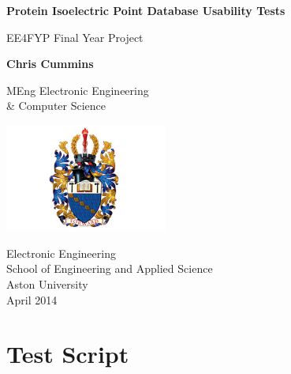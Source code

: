 \documentclass[12pt,twoside]{report}
\begin{document}

%
%
%
\begin{titlepage}
  \begin{center}
    \vspace*{1cm}

    \Huge
    \textbf{Protein Isoelectric Point Database Usability Tests}

    \vspace{0.5cm}
    \LARGE
    EE4FYP Final Year Project

    \vspace{1.5cm}

    \textbf{Chris Cummins}

    \vfill

    MEng Electronic Engineering\\
    \& Computer Science

    \vspace{0.8cm}

    \includegraphics[width=0.4\textwidth]{assets/aston.jpeg}

    \Large
    Electronic Engineering\\
    School of Engineering and Applied Science\\
    Aston University\\
    April 2014

  \end{center}
\end{titlepage}

\tableofcontents


\chapter{Test Script}
\end{document}
